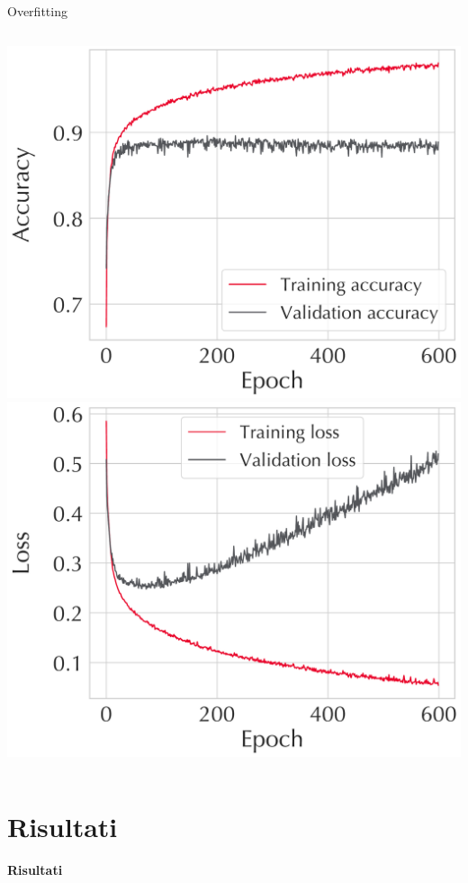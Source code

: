 \documentclass{beamer}
\begin{document}
\begin{frame}{Overfitting}
  \vspace*{3.5ex}
  \begin{columns}
      \centering
      \includegraphics[width=\linewidth]{./Images/Z64_64_adam_relu_acc.pdf}
      \centering
      \includegraphics[width=\linewidth]{./Images/Z64_64_adam_relu_rock.pdf}
  \end{columns}
\end{frame}


\section{Risultati}
\begin{frame}
  \centering
  \Huge\bfseries
  Risultati
\end{frame}
\end{document}
